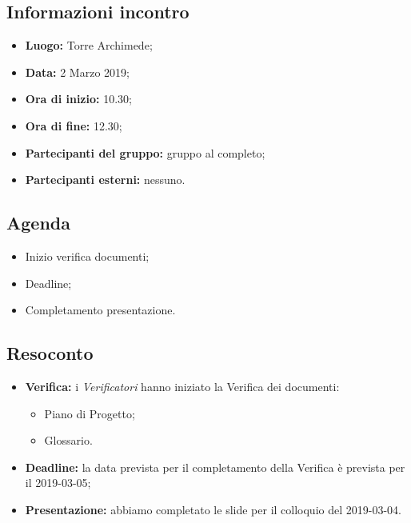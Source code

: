 \subsection{Informazioni incontro}
\begin{itemize}
	\item { \textbf{Luogo:} Torre Archimede};
	\item { \textbf{Data:} 2 Marzo 2019};
	\item { \textbf{Ora di inizio:} 10.30};
	\item { \textbf{Ora di fine:} 12.30};
	\item { \textbf{Partecipanti del gruppo:} gruppo al completo};
	\item { \textbf{Partecipanti esterni:} nessuno}.
\end{itemize}


\subsection{Agenda}
\begin{itemize}
	\item {Inizio verifica documenti;}
	\item {Deadline;}
	\item {Completamento presentazione.}
\end{itemize}

\subsection{Resoconto}
\begin{itemize}
	\item { \textbf{Verifica:} i \emph{Verificatori} hanno iniziato la Verifica dei documenti:
	\begin{itemize}
		\item Piano di Progetto;
		\item Glossario.
	\end{itemize}}
	\item {\textbf{Deadline:} la data prevista per il completamento della Verifica è prevista per il 2019-03-05;}
	\item { \textbf{Presentazione:} abbiamo completato le slide per il colloquio del 2019-03-04.}
\end{itemize}

